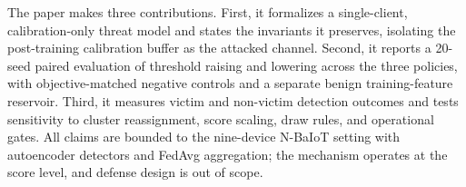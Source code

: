 The paper makes three contributions.
First, it formalizes a single-client, calibration-only threat model and states the invariants it preserves, isolating the post-training calibration buffer as the attacked channel.
Second, it reports a 20-seed paired evaluation of threshold raising and lowering across the three policies, with objective-matched negative controls and a separate benign training-feature reservoir.
Third, it measures victim and non-victim detection outcomes and tests sensitivity to cluster reassignment, score scaling, draw rules, and operational gates.
All claims are bounded to the nine-device N-BaIoT setting with autoencoder detectors and FedAvg aggregation; the mechanism operates at the score level, and defense design is out of scope.
